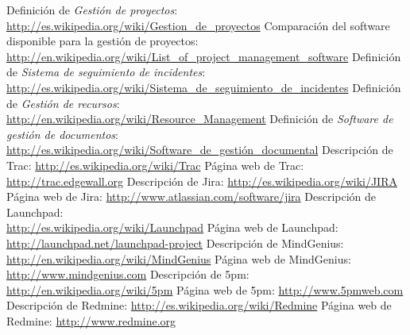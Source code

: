 \documentclass[11pt,a4paper,spanish,twoside]{report}
\begin{document}
\begin{thebibliography}{99}
 Definición de \emph{Gestión de proyectos}:
\\ \url{http://es.wikipedia.org/wiki/Gestion_de_proyectos}
 Comparación del software disponible para la gestión de proyectos:
\\ \url{http://en.wikipedia.org/wiki/List_of_project_management_software}
 Definición de \emph{Sistema de seguimiento de incidentes}:
\\ \url{http://es.wikipedia.org/wiki/Sistema_de_seguimiento_de_incidentes}
 Definición de \emph{Gestión de recursos}:
\\ \url{http://en.wikipedia.org/wiki/Resource_Management}
 Definición de \emph{Software de gestión de documentos}:
\\ \url{http://es.wikipedia.org/wiki/Software_de_gestión_documental}
 Descripción de Trac:
  \url{http://es.wikipedia.org/wiki/Trac}
 Página web de Trac:
  \url{http://trac.edgewall.org}
 Descripción de Jira:
  \url{http://es.wikipedia.org/wiki/JIRA}
 Página web de Jira:
  \url{http://www.atlassian.com/software/jira}
 Descripción de Launchpad:\\
  \url{http://es.wikipedia.org/wiki/Launchpad}
 Página web de Launchpad:\\
  \url{http://launchpad.net/launchpad-project}
 Descripción de MindGenius:\\
  \url{http://en.wikipedia.org/wiki/MindGenius}
 Página web de MindGenius:
  \url{http://www.mindgenius.com}
 Descripción de 5pm:
  \url{http://en.wikipedia.org/wiki/5pm}
 Página web de 5pm:
  \url{http://www.5pmweb.com}
 Descripción de Redmine:
  \url{http://es.wikipedia.org/wiki/Redmine}
 Página web de Redmine:
  \url{http://www.redmine.org}
\end{thebibliography}
\end{document}
